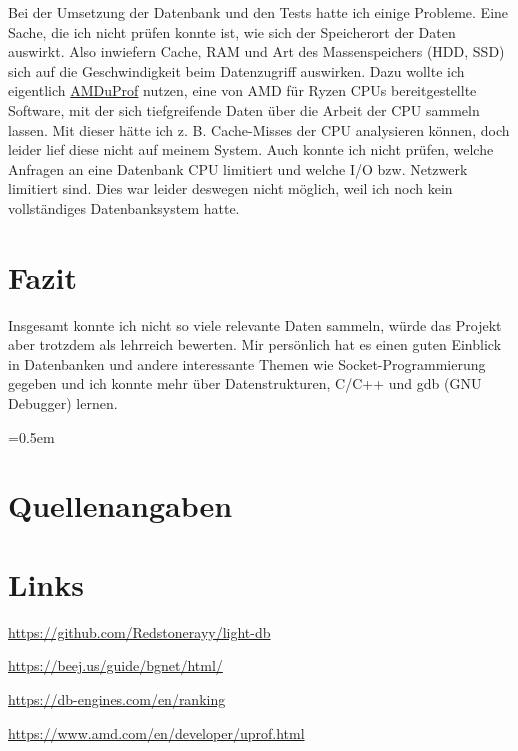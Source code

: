 \documentclass[11pt,a4paper]{article}
\begin{document}
Bei der Umsetzung der Datenbank und den Tests hatte ich einige Probleme.
Eine Sache, die ich nicht prüfen konnte ist, wie sich der Speicherort der Daten
auswirkt. Also inwiefern Cache, RAM und Art des Massenspeichers (HDD, SSD)
sich auf die Geschwindigkeit beim Datenzugriff auswirken.
Dazu wollte ich eigentlich \href{https://www.amd.com/en/developer/uprof.html}{AMDuProf}
nutzen, eine von AMD für Ryzen CPUs bereitgestellte Software, mit der sich tiefgreifende
Daten über die Arbeit der CPU sammeln lassen. Mit dieser hätte ich z. B. Cache-Misses
der CPU analysieren können, doch leider lief diese nicht auf meinem System.
Auch konnte ich nicht prüfen, welche Anfragen an eine Datenbank CPU limitiert
und welche I/O bzw. Netzwerk limitiert sind. Dies war leider deswegen nicht
möglich, weil ich noch kein vollständiges Datenbanksystem hatte.

\section{Fazit}

Insgesamt konnte ich nicht so viele relevante Daten sammeln, würde das Projekt aber
trotzdem als lehrreich bewerten. Mir persönlich hat es einen guten Einblick in
Datenbanken und andere interessante Themen wie Socket-Programmierung gegeben
und ich konnte mehr über Datenstrukturen, C/C++ und gdb (GNU Debugger) lernen.

\clearpage

\emergencystretch=0.5em

\section{Quellenangaben}

\section*{Links}

\url{https://github.com/Redstonerayy/light-db}

\url{https://beej.us/guide/bgnet/html/}

\url{https://db-engines.com/en/ranking}

\url{https://www.amd.com/en/developer/uprof.html}

\printbibliography[title={Literaturverzeichnis}]
\end{document}
